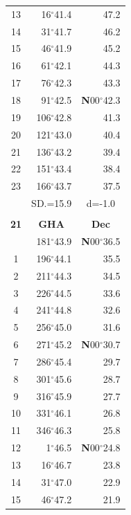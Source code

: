 \documentclass[10pt, a4paper]{report}
\begin{document}
\begin{scriptsize}
\begin{tabular*}{0.2\textwidth}[t]{@{\extracolsep{\fill}}|c|rr|}
13 & 16$^\circ$41.4 & 47.2\\
14 & 31$^\circ$41.7 & 46.2\\
15 & 46$^\circ$41.9 & \raisebox{0.24ex}{\boldmath$\cdot$~\boldmath$\cdot$~~}45.2\\
16 & 61$^\circ$42.1 & 44.3\\
17 & 76$^\circ$42.3 & 43.3\\[2Pt]
18 & 91$^\circ$42.5 & \textbf{N}00$^\circ$42.3\\
19 & 106$^\circ$42.8 & 41.3\\
20 & 121$^\circ$43.0 & 40.4\\
21 & 136$^\circ$43.2 & \raisebox{0.24ex}{\boldmath$\cdot$~\boldmath$\cdot$~~}39.4\\
22 & 151$^\circ$43.4 & 38.4\\
23 & 166$^\circ$43.7 & 37.5\\
\hline
\rule{0pt}{2.4ex} & \multicolumn{1}{c}{SD.=15.9} & \multicolumn{1}{c|}{d=-1.0}\\
\hline
\multicolumn{1}{c}{}\\[-0.5ex]\hline
\multicolumn{1}{|c|}{\rule{0pt}{2.6ex}\textbf{21}} & \multicolumn{1}{c}{\textbf{GHA}} & \multicolumn{1}{c|}{\textbf{Dec}}\\
\hline\rule{0pt}{2.6ex}\noindent
0 & 181$^\circ$43.9 & \textbf{N}00$^\circ$36.5\\
1 & 196$^\circ$44.1 & 35.5\\
2 & 211$^\circ$44.3 & 34.5\\
3 & 226$^\circ$44.5 & \raisebox{0.24ex}{\boldmath$\cdot$~\boldmath$\cdot$~~}33.6\\
4 & 241$^\circ$44.8 & 32.6\\
5 & 256$^\circ$45.0 & 31.6\\[2Pt]
6 & 271$^\circ$45.2 & \textbf{N}00$^\circ$30.7\\
7 & 286$^\circ$45.4 & 29.7\\
8 & 301$^\circ$45.6 & 28.7\\
9 & 316$^\circ$45.9 & \raisebox{0.24ex}{\boldmath$\cdot$~\boldmath$\cdot$~~}27.7\\
10 & 331$^\circ$46.1 & 26.8\\
11 & 346$^\circ$46.3 & 25.8\\[2Pt]
12 & 1$^\circ$46.5 & \textbf{N}00$^\circ$24.8\\
13 & 16$^\circ$46.7 & 23.8\\
14 & 31$^\circ$47.0 & 22.9\\
15 & 46$^\circ$47.2 & \raisebox{0.24ex}{\boldmath$\cdot$~\boldmath$\cdot$~~}21.9\\

\end{tabular*}
\end{scriptsize}
\end{document}
